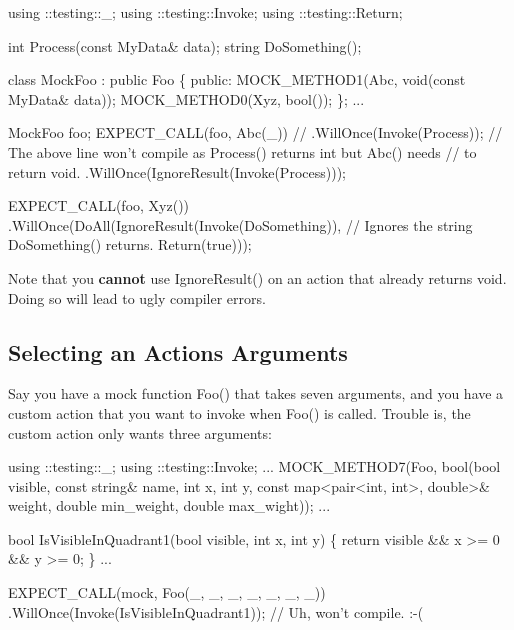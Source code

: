 \begin{DoxyCode}
using ::testing::\_;
using ::testing::Invoke;
using ::testing::Return;

\textcolor{keywordtype}{int} Process(\textcolor{keyword}{const} MyData& data);
\textcolor{keywordtype}{string} DoSomething();

\textcolor{keyword}{class }MockFoo : \textcolor{keyword}{public} Foo \{
 \textcolor{keyword}{public}:
  MOCK\_METHOD1(Abc, \textcolor{keywordtype}{void}(\textcolor{keyword}{const} MyData& data));
  MOCK\_METHOD0(Xyz, \textcolor{keywordtype}{bool}());
\};
...

  MockFoo foo;
  EXPECT\_CALL(foo, Abc(\_))
  \textcolor{comment}{// .WillOnce(Invoke(Process));}
  \textcolor{comment}{// The above line won't compile as Process() returns int but Abc() needs}
  \textcolor{comment}{// to return void.}
      .WillOnce(IgnoreResult(Invoke(Process)));

  EXPECT\_CALL(foo, Xyz())
      .WillOnce(DoAll(IgnoreResult(Invoke(DoSomething)),
      \textcolor{comment}{// Ignores the string DoSomething() returns.}
                      Return(\textcolor{keyword}{true})));
\end{DoxyCode}


Note that you {\bfseries cannot} use {\ttfamily Ignore\+Result()} on an action that already returns {\ttfamily void}. Doing so will lead to ugly compiler errors.

\subsection*{Selecting an Action\textquotesingle{}s Arguments}

Say you have a mock function {\ttfamily Foo()} that takes seven arguments, and you have a custom action that you want to invoke when {\ttfamily Foo()} is called. Trouble is, the custom action only wants three arguments\+:


\begin{DoxyCode}
using ::testing::\_;
using ::testing::Invoke;
...
  MOCK\_METHOD7(Foo, \textcolor{keywordtype}{bool}(\textcolor{keywordtype}{bool} visible, \textcolor{keyword}{const} \textcolor{keywordtype}{string}& name, \textcolor{keywordtype}{int} x, \textcolor{keywordtype}{int} y,
                         \textcolor{keyword}{const} map<pair<int, int>, \textcolor{keywordtype}{double}>& weight,
                         \textcolor{keywordtype}{double} min\_weight, \textcolor{keywordtype}{double} max\_wight));
...

bool IsVisibleInQuadrant1(\textcolor{keywordtype}{bool} visible, \textcolor{keywordtype}{int} x, \textcolor{keywordtype}{int} y) \{
  \textcolor{keywordflow}{return} visible && x >= 0 && y >= 0;
\}
...

  EXPECT\_CALL(mock, Foo(\_, \_, \_, \_, \_, \_, \_))
      .WillOnce(Invoke(IsVisibleInQuadrant1));  \textcolor{comment}{// Uh, won't compile. :-(}
\end{DoxyCode}


